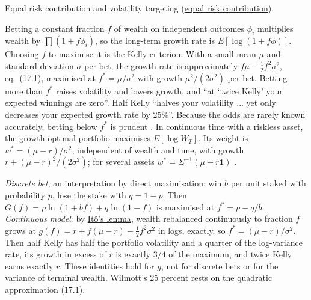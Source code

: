 \begin{qfmethod}
 Equal risk contribution and volatility targeting (\hyperref[meth:equal-risk-contribution]{equal risk contribution}).

\end{qfmethod}

\begin{qfresult}\label{res:kelly-growth-optimal-fraction}
 Betting a constant fraction $f$ of wealth on independent outcomes $\phi_i$ multiplies wealth by $\prod(1+f\phi_i)$, so the long-term growth rate is $E[\log(1+f\phi)]$. Choosing $f$ to maximise it is the Kelly criterion. With a small mean $\mu$ and standard deviation $\sigma$ per bet, the growth rate is approximately $f\mu-\tfrac12f^2\sigma^2$, eq.~(17.1), maximised at $f^*=\mu/\sigma^2$ with growth $\mu^2/(2\sigma^2)$ per bet. Betting more than $f^*$ raises volatility and lowers growth, and ``at `twice Kelly' your expected winnings are zero''. Half Kelly ``halves your volatility ... yet only decreases your expected growth rate by 25\%''. Because the odds are rarely known accurately, betting below $f^*$ is prudent \citep[chap.~17, sec.~17.5, pp.~306--309]{wide-wilmott-pwoqf}. In continuous time with a riskless asset, the growth-optimal portfolio maximises $E[\log W_T]$. Its weight is $w^*=(\mu-r)/\sigma^2$, independent of wealth and time, with growth $r+(\mu-r)^2/(2\sigma^2)$; for several assets $w^*=\Sigma^{-1}(\mu-r\mathbf 1)$ \citep[chap.~66, sec.~66.4, pp.~1057--1058]{wide-wilmott-pwoqf}.

 \emph{Discrete bet}, an interpretation by direct maximisation: win $b$ per unit staked with probability $p$, lose the stake with $q=1-p$. Then $G(f)=p\ln(1+bf)+q\ln(1-f)$ is maximised at $f^*=p-q/b$. \emph{Continuous model}: by \hyperref[res:ito-lemma-geometric-brownian-motion]{It\^o's lemma}, wealth rebalanced continuously to fraction $f$ grows at $g(f)=r+f(\mu-r)-\tfrac12f^2\sigma^2$ in logs, exactly, so $f^*=(\mu-r)/\sigma^2$. Then half Kelly has half the portfolio volatility and a quarter of the log-variance rate, its growth in excess of $r$ is exactly $3/4$ of the maximum, and twice Kelly earns exactly $r$. These identities hold for $g$, not for discrete bets or for the variance of terminal wealth. Wilmott's 25 percent rests on the quadratic approximation (17.1).


\end{qfresult}
